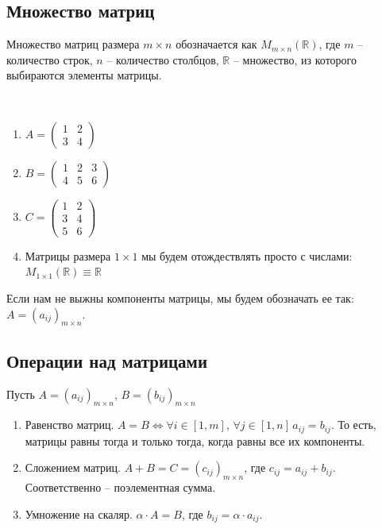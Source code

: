 \documentclass[12pt, a4paper]{article}
\begin{document}
    \subsection{Множество матриц}
    Множество матриц размера \( m \times n \) обозначается как \( M_{m\times n}(\mathbb{R}) \), где \( m \) -- количество строк, \( n \) -- количество столбцов, \( \mathbb{R} \) -- множество, из которого выбираются элементы матрицы.
    \begin{exmp}
        \(  \)
        \begin{enumerate}
            \item \( A = \begin{pmatrix} 1  & 2 \\ 3 & 4 \end{pmatrix}  \)
            \item \( B = \begin{pmatrix} 1 & 2 & 3 \\ 4 & 5 & 6\end{pmatrix}\)
            \item \( C = \begin{pmatrix} 1 & 2 \\ 3 & 4 \\ 5 & 6 \end{pmatrix}   \)
            \item Матрицы размера \( 1\times 1 \) мы будем отождествлять просто с числами: \( M_{1\times 1}(\mathbb{R}) \equiv \mathbb{R} \)
        \end{enumerate}
        
    \end{exmp}
    Если нам не выжны компоненты матрицы, мы будем обозначать ее так: \( A = (a_{ij})_{m \times n} \).
    \subsection{Операции над матрицами}
    Пусть \( A = (a_{ij})_{m \times n} \), \( B = (b_{ij})_{m \times n} \)
    \begin{enumerate}
        \item Равенство матриц. \( A = B \iff \forall i \in [1, m], \, \forall j \in [1, n] \, a_{ij} = b_{ij} \).  То есть, матрицы равны тогда и только тогда, когда равны все их компоненты.
        \item Сложением матриц. \( A + B = C = (c_{ij})_{m\times n} \), где \( c_{ij} = a_{ij} + b_{ij} \). Соответственно -- поэлементная сумма.
        \item Умножение на скаляр. \( \alpha \cdot A = B \), где \( b_{ij} = \alpha \cdot a_{ij} \).
    \end{enumerate}
\end{document}
